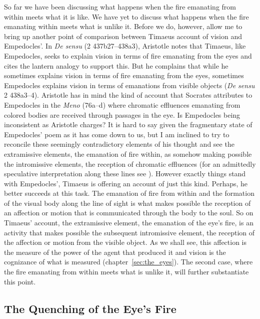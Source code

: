So far we have been discussing what happens when the fire emanating from within meets what it is like. We have yet to discuss what happens when the fire emanating within meets what is unlike it. Before we do, however, allow me to bring up another point of comparison between Timaeus account of vision and Empedocles'. In \emph{De sensu} (2 437b27--438a3), Aristotle notes that Timaeus, like Empedocles, seeks to explain vision in terms of fire emanating from the eyes and cites the lantern analogy to support this. But he complains that while he sometimes explains vision in terms of fire emanating from the eyes, sometimes Empedocles explains vision in terms of emanations from visible objects (\emph{De sensu} 2 438a3--4). Aristotle has in mind the kind of account that Socrates attributes to Empedocles in the \emph{Meno} (76a--d) where chromatic effluences emanating from colored bodies are received through passages in the eye. Is Empedocles being inconsistent as Aristotle charges? It is hard to say given the fragmentary state of Empedocles' poem as it has come down to us, but I am inclined to try to reconcile these seemingly contradictory elements of his thought and see the extramissive elements, the emanation of fire within, as somehow making possible the intromissive elements, the reception of chromatic effluences (for an admittedly speculative interpretation along these lines see \citealt[chapter 1.3]{Kalderon:2015fr}). However exactly things stand with Empedocles', Timaeus is offering an account of just this kind. Perhaps, he better succeeds at this task. The emanation of fire from within and the formation of the visual body along the line of sight is what makes possible the reception of an affection or motion that is communicated through the body to the soul. So on Timaeus' account, the extramissive element, the emanation of the eye's fire, is an activity that makes possible the subsequent intromissive element, the reception of the affection or motion from the visible object. As we shall see, this affection is the measure of the power of the agent that produced it and vision is the cognizance of what is measured (chapter~\ref{sec:the_eyes}). The second case, where the fire emanating from within meets what is unlike it, will further substantiate this point.


\subsection{The Quenching of the Eye's Fire} %
\label{sub:the_quenching_of_the_eye_s_fire}

